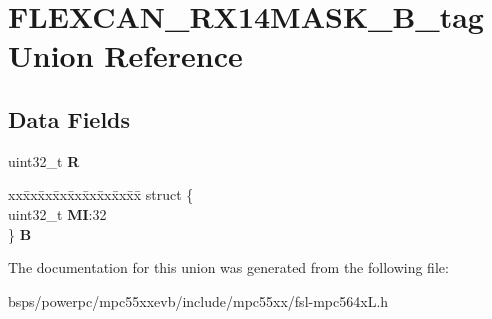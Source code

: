 \hypertarget{unionFLEXCAN__RX14MASK__32B__tag}{}\section{F\+L\+E\+X\+C\+A\+N\+\_\+\+R\+X14\+M\+A\+S\+K\+\_\+B\+\_\+tag Union Reference}
\label{unionFLEXCAN__RX14MASK__32B__tag}
\subsection*{Data Fields}
\begin{DoxyCompactItemize}
\item 
\mbox{\label{unionFLEXCAN__RX14MASK__32B__tag_a11b90b5b535f95f4193195170a7c4964}} 
uint32\+\_\+t {\bfseries R}
\item 
\mbox{\label{unionFLEXCAN__RX14MASK__32B__tag_a53f9acca2eb510cdb7e184b6c27276fb}} 
\begin{tabbing}
xx\=xx\=xx\=xx\=xx\=xx\=xx\=xx\=xx\=\kill
struct \{\\
\>uint32\_t {\bfseries MI}:32\\
\} {\bfseries B}\\

\end{tabbing}\end{DoxyCompactItemize}


The documentation for this union was generated from the following file\+:\begin{DoxyCompactItemize}
\item 
bsps/powerpc/mpc55xxevb/include/mpc55xx/fsl-\/mpc564x\+L.\+h\end{DoxyCompactItemize}
